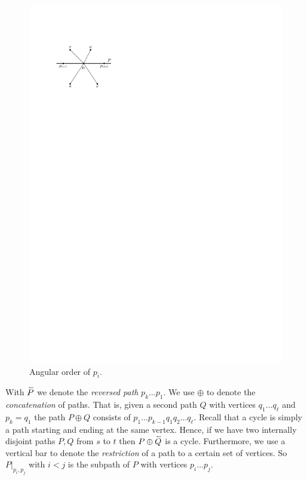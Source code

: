     \begin{figure}[b]
      \centering
      \includegraphics[scale=1]{unifiedAlgo/img/rightNeighbourwalk/rotation}
      \caption{Angular order of $p_i$.}
      \label{fig:right:rot}
    \end{figure}

    With $\accentset{\leftharpoonup}{P}$ we denote the \emph{reversed path} $p_k \ldots p_1$. We use $\oplus$ to denote the \emph{concatenation} of paths.
    That is, given a second path $Q$ with vertices $q_1 \ldots q_\ell$ and $p_k = q_1$ the path $P \oplus Q$ consists of $p_1 \ldots p_{k-1} q_1 q_2 \ldots q_\ell$.
    Recall that a cycle is simply a path starting and ending at the same vertex.
    Hence, if we have two internally disjoint paths $P, Q$ from $s$ to $t$ then $P \oplus \accentset{\leftharpoonup}{Q}$ is a cycle.
    Furthermore, we use a vertical bar to denote the \emph{restriction} of a path to a certain set of vertices. So $P|_{p_i, p_j}$ with $i<j$ is the subpath of $P$ with vertices $p_i \ldots p_j$.

